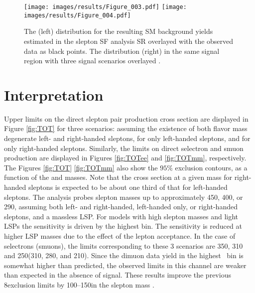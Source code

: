 \begin{figure}[ht!]
\centering
\texttt{[image: images/results/Figure\_003.pdf]}
\texttt{[image: images/results/Figure\_004.pdf]}
\caption{The \ptmiss (left) distribution for the resulting SM background yields estimated in the slepton SF analysis SR overlayed with the observed data as black points.
The \mttwo distribution (right) in the same signal region with three signal scenarios overlayed \cite{Sirunyan:2018nwe}.}
\label{fig:results}
\end{figure}
\section{Interpretation}
\noindent
\justify
Upper limits on the direct slepton pair production cross section are displayed in Figure \ref{fig:TOT} for three scenarios: assuming the existence of both flavor mass degenerate left- and
right-handed sleptons, for only left-handed sleptons, and for only right-handed sleptons. 
Similarly, the limits on direct selectron and smuon production are displayed in Figures \ref{fig:TOTee} and \ref{fig:TOTmm}, respectively.
The Figures \ref{fig:TOT} \ref{fig:TOTmm} also show the $95\%$ \CL exclusion contours, as a function of the \slep and \lsp masses.
Note that the cross section at a given mass for right-handed sleptons is expected to be about one third of that for left-handed sleptons.
The analysis probes slepton masses up to approximately 450, 400, or 290\GeV, assuming both left- and right-handed, left-handed only, or right-handed sleptons, and a massless LSP.
For models with high slepton masses and light LSPs the sensitivity is driven by the highest \ptmiss bin. The sensitivity is reduced at higher LSP masses due to the effect of the lepton acceptance.
In the case of selectrons (smuons), the limits corresponding to these 3 scenarios are 350, 310 and 250\GeV (310, 280, and 210\GeV).
Since the dimuon data yield in the highest \ptmiss\ bin is somewhat higher than predicted, the observed limits in this channel are weaker than expected in the absence of signal.
These results improve the previous 8\TeV exclusion limits by 100--150\GeV in the slepton mass \cite{Khachatryan:2014qwa}.
